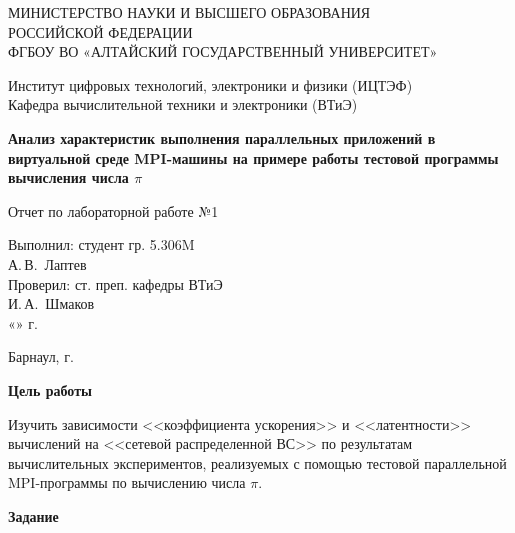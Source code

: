 \documentclass{altsu-bachelor}
\begin{document}
\begin{titlepage}
 \begin{center}
    \normalsize
    МИНИСТЕРСТВО НАУКИ И ВЫСШЕГО ОБРАЗОВАНИЯ \\
    РОССИЙСКОЙ ФЕДЕРАЦИИ \\
    ФГБОУ ВО «АЛТАЙСКИЙ ГОСУДАРСТВЕННЫЙ УНИВЕРСИТЕТ»
    \vfill
     
    Институт цифровых технологий, электроники и физики (ИЦТЭФ) \\
    Кафедра вычислительной техники и электроники (ВТиЭ)
    \vfill
     
    \textbf{Анализ характеристик выполнения параллельных приложений в виртуальной среде MPI-машины на примере работы тестовой программы вычисления числа $\pi$}
    
    Отчет по лабораторной работе №1
 \end{center}
\vfill
 
\newlength{\ML}
\hfill\begin{minipage}{0.41\textwidth}
  Выполнил: студент гр. 5.306M\\
  \underline{\hspace{\ML}} А.\,В.~Лаптев \\
  Проверил: ст. преп. кафедры ВТиЭ\\
  \underline{\hspace{\ML}} И.\,А.~Шмаков \\
  «\underline{\hspace{1cm}}» \underline{\hspace{3cm}} \the\year г.
\end{minipage}%
\vfill
 
\begin{center}
  Барнаул, \the\year г.
\end{center}
\end{titlepage}

\setcounter{page}{2}

\textbf{Цель работы}

Изучить зависимости <<коэффициента ускорения>> и <<латентности>> вычислений на <<сетевой распределенной ВС>> по результатам вычислительных экспериментов, реализуемых с помощью тестовой параллельной MPI-программы по вычислению числа $\pi$.

\textbf{Задание}
\end{document}
